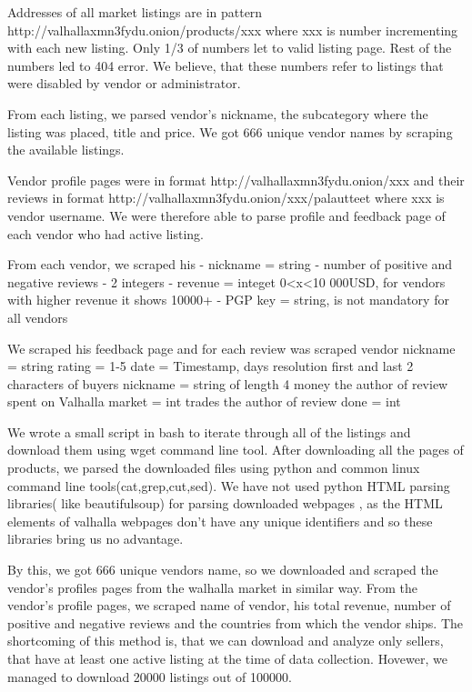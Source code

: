 \documentclass[
  digital, %
  table,   %
  lof,     %
  lot,     %
  oneside
]{fithesis3}
\begin{document}
Addresses of all market listings are in pattern http://valhallaxmn3fydu.onion/products/xxx where 
xxx is number incrementing with each new listing. Only 1/3 of numbers let to valid listing page.
Rest of the numbers led to 404 error. We believe, that these numbers refer to listings that were disabled by vendor
 or administrator.

From each listing, we parsed vendor's nickname, the subcategory where the listing was placed, title and price.
We got 666 unique vendor names by scraping the available listings.

Vendor profile pages were in format http://valhallaxmn3fydu.onion/xxx and their reviews in format
 http://valhallaxmn3fydu.onion/xxx/palautteet where xxx is vendor username.
 We were therefore able to parse profile and feedback page of each vendor who had active listing. 
 
From each vendor, we scraped his
- nickname = string
- number of positive and negative reviews - 2 integers
- revenue = integet 0<x<10 000USD, for vendors with higher revenue it shows 10000+
- PGP key = string, is not mandatory for all vendors

We scraped his feedback page and for each review was scraped
vendor nickname = string
rating = 1-5
date = Timestamp, days resolution
first and last 2 characters of buyers nickname = string of length 4
money the author of review spent on Valhalla market = int
trades the author of review done = int

We wrote a small script in bash to iterate through all of the listings and download them using wget command line tool.
After downloading all the pages of products, we parsed the downloaded files using python and common linux command 
line tools(cat,grep,cut,sed). We have not used python HTML parsing libraries( like beautifulsoup) for parsing downloaded
webpages , as the HTML elements of valhalla webpages don't have any unique identifiers and so these libraries bring
 us no advantage.
 
By this, we got 666 unique vendors name, so we downloaded and scraped the vendor's profiles pages from the walhalla 
market in similar way.
From the vendor's profile pages, we scraped name of vendor, his total revenue, number of positive and negative reviews 
and the countries from which the vendor ships.
The shortcoming of this method is, that we can download and analyze only sellers, 
that have at least one active listing at the time of data collection. 
Hovewer, we managed to download 20000 listings out of 100000.
\end{document}
